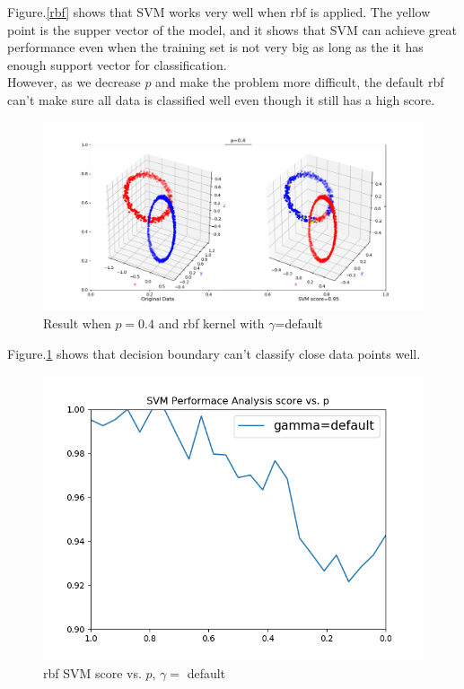 \documentclass{article}
\begin{document}
Figure.\ref{rbf} shows that SVM works very well when rbf is applied. The yellow point is the supper vector of the model, and it shows that SVM can achieve great performance even when the training set is not very big as long as the it has enough support vector for classification.
\\However, as we decrease $p$ and make the problem more difficult, the default rbf can't make sure all data is classified well even though it still has a high score.
\begin{figure}[H]
    \centering
    \includegraphics[scale=0.5]{7.png}
    \caption{Result when $p=0.4$ and rbf kernel with $\gamma$=default}
    \label{7}
\end{figure}
Figure.\ref{7} shows that decision boundary can't classify close data points well. 
\begin{figure}[H]
    \centering
    \includegraphics[scale=0.4]{svma1.png}
    \caption{rbf SVM score vs. $p$, $\gamma=$ default}
    \label{svma1}
\end{figure}
\end{document}
